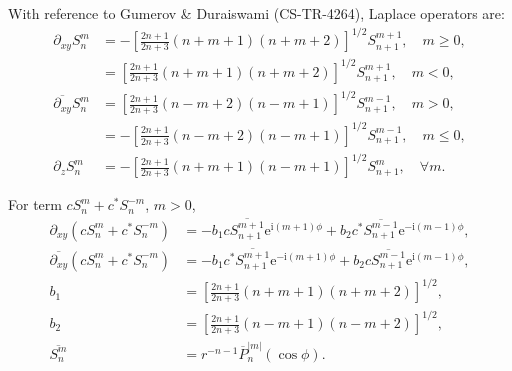 \documentclass[a4paper,12pt]{article}
\newcommand{\E}{\mathrm{e}}
\newcommand{\J}{\mathrm{i}}
\begin{document}
With reference to Gumerov \& Duraiswami (CS-TR-4264), Laplace
operators are:
\begin{align}
  \partial_{xy} S_{n}^{m}
  &=
    -\left[
    \frac{2n+1}{2n+3}(n+m+1)(n+m+2)
    \right]^{1/2}
    S_{n+1}^{m+1},\quad m \geq 0,\\
  &=
    \left[
    \frac{2n+1}{2n+3}(n+m+1)(n+m+2)
    \right]^{1/2}
    S_{n+1}^{m+1},\quad m < 0,\\
  \overline{\partial_{xy}} S_{n}^{m}
  &=
    \left[
    \frac{2n+1}{2n+3}(n-m+2)(n-m+1)
    \right]^{1/2}
    S_{n+1}^{m-1},\quad m > 0,\\
  &=
    -\left[
    \frac{2n+1}{2n+3}(n-m+2)(n-m+1)
    \right]^{1/2}
    S_{n+1}^{m-1},\quad m \leq 0,\\
  \partial_{z}S_{n}^{m}
  &=
    -\left[
    \frac{2n+1}{2n+3}(n+m+1)(n-m+1)    
    \right]^{1/2}
    S_{n+1}^{m},\quad \forall m.
\end{align}

For term $cS_{n}^{m}+c^{*}S_{n}^{-m}$, $m>0$,
\begin{align}
  \partial_{xy} \left(cS_{n}^{m} + c^{*}S_{n}^{-m}\right)
  &=
    -b_{1}c
    \overline{S_{n+1}^{m+1}}\E^{\J(m+1)\phi}
    +b_{2}c^{*}
    \overline{S_{n+1}^{m-1}}\E^{-\J(m-1)\phi},\\
  \overline{\partial_{xy}} \left(cS_{n}^{m} + c^{*}S_{n}^{-m}\right)
  &=
    -b_{1}c^{*} \overline{S_{n+1}^{m+1}}\E^{-\J(m+1)\phi}
    +b_{2}c \overline{S_{n+1}^{m-1}}\E^{\J(m-1)\phi},\\
  b_{1} &=
          \left[
          \frac{2n+1}{2n+3}(n+m+1)(n+m+2)
          \right]^{1/2},\\
  b_{2} &=
          \left[
          \frac{2n+1}{2n+3}(n-m+1)(n-m+2)
          \right]^{1/2},\\
  \overline{S_{n}^{m}}
  &=
    r^{-n-1}\overline{P}_{n}^{|m|}(\cos\phi).
\end{align}
\end{document}
